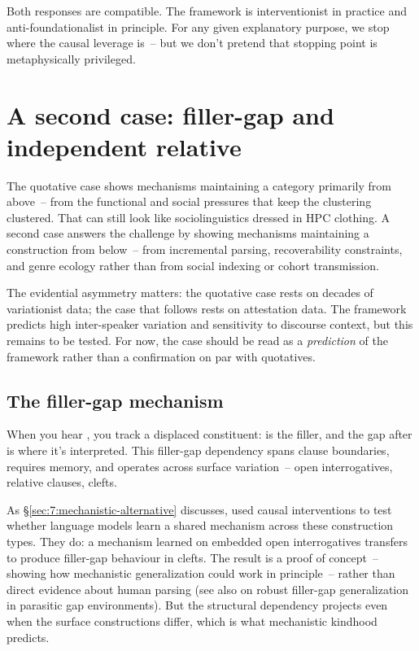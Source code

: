 Both responses are compatible. The framework is interventionist in practice and anti-foundationalist in principle. For any given explanatory purpose, we stop where the causal leverage is~-- but we don't pretend that stopping point is metaphysically privileged.


\section{A second case: filler-gap and independent relative }
\label{sec:6:filler-gap-whose}

The quotative case shows mechanisms maintaining a category primarily from above~-- from the functional and social pressures that keep the clustering clustered. That can still look like sociolinguistics dressed in HPC clothing. A second case answers the challenge by showing mechanisms maintaining a construction from below~-- from incremental parsing, recoverability constraints, and genre ecology rather than from social indexing or cohort transmission.

The evidential asymmetry matters: the quotative case rests on decades of variationist data; the  case that follows rests on attestation data. The framework predicts high inter-speaker variation and sensitivity to discourse context, but this remains to be tested. For now, the  case should be read as a \emph{prediction} of the framework rather than a confirmation on par with quotatives.

\subsection{The filler-gap mechanism}
\label{sec:6:filler-gap-mechanism}

When you hear , you track a displaced constituent:  is the filler, and the gap after  is where it's interpreted. This filler-gap dependency spans clause boundaries, requires memory, and operates across surface variation~-- open interrogatives, relative clauses, clefts.

As §\ref{sec:7:mechanistic-alternative} discusses, \textcite{boguraev2025} used causal interventions to test whether language models learn a shared mechanism across these construction types. They do: a mechanism learned on embedded open interrogatives transfers to produce filler-gap behaviour in clefts. The result is a proof of concept~-- showing how mechanistic generalization could work in principle~-- rather than direct evidence about human parsing (see also \citealt{pistotti2025gaps} on robust filler-gap generalization in parasitic gap environments). But the structural dependency projects even when the surface constructions differ, which is what mechanistic kindhood predicts.

